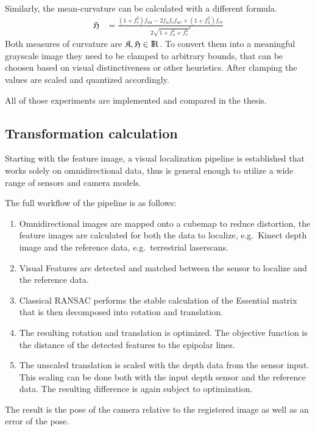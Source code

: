 \documentclass[doktyp=marbeit,fontsize=12pt,sprache=english,draft=true,hausschrift=true,fleqn]{TUBAFarbeiten}
\begin{document}
Similarly, the \Gls{mean-curvature} can be calculated with a different formula.
\begin{align}
    \mathfrak{H} &= \frac{{(1 + f_{v}^2)} f_{uu} - 2 f_u f_v f_{uv} + {(1 + f_u^2)} f_{vv}}{2 \sqrt{1 + f_u^2 + f_v^2}^3}
\end{align}
Both measures of curvature are $\mathfrak{K},\mathfrak{H} \in {\rm I\!R}$.
To convert them into a meaningful grayscale image they need to be clamped to arbitrary bounds, that can be choosen based on visual distinctiveness or other heuristics.
After clamping the values are scaled and quantized accordingly.

All of those experiments are implemented and compared in the thesis.

\subsection{Transformation calculation}\label{transformation-calculation}

Starting with the feature image, a visual localization pipeline is
established that works solely on omnidirectional data, thus is general
enough to utilize a wide range of sensors and camera models.

The full workflow of the pipeline is as follows:

\begin{enumerate}
\item Omnidirectional images are mapped onto a cubemap to reduce distortion,
  the feature images are calculated for both the data to localize,
  e.g.~Kinect depth image and the reference data, e.g.~terrestrial
  laserscans.
\item Visual Features are detected and matched between the sensor to
  localize and the reference data.
\item Classical RANSAC performs the stable calculation of the
  Essential matrix that is then decomposed into rotation and translation.
\item The resulting rotation and translation is optimized. The objective
  function is the distance of the detected features to the epipolar
  lines.
\item The unscaled translation is scaled with the depth data from the sensor
  input. This scaling can be done both with the input depth sensor and
  the reference data. The resulting difference is again subject to
  optimization.
\end{enumerate}

The result is the pose of the camera relative to the registered image as well as an error of the pose.
\end{document}
